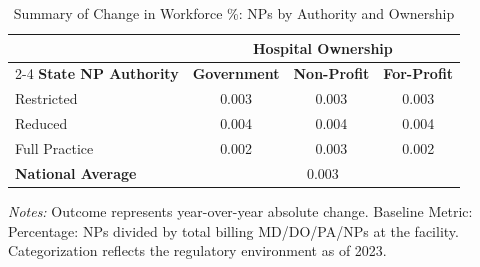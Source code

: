 \begin{table}[htbp]
    \centering
    \caption{Summary of Change in Workforce \%: NPs by Authority and Ownership}
    \label{tab:d_pct_np_own}
    \vspace{0.2cm}
    \begin{tabular}{lccc}
        \toprule
        & \multicolumn{3}{c}{\textbf{Hospital Ownership}} \\
        \cmidrule(lr){2-4}
        \textbf{State NP Authority} & \textbf{Government} & \textbf{Non-Profit} & \textbf{For-Profit} \\
        \midrule
        Restricted & 0.003 & 0.003 & 0.003 \\
        Reduced & 0.004 & 0.004 & 0.004 \\
        Full Practice & 0.002 & 0.003 & 0.002 \\
        \midrule
        \textbf{National Average} & \multicolumn{3}{c}{0.003} \\
        \bottomrule
    \end{tabular}
    \vspace{0.1cm}
    \begin{minipage}{0.85\textwidth}
        \footnotesize \textit{Notes:} Outcome represents year-over-year absolute change. Baseline Metric: Percentage: NPs divided by total billing MD/DO/PA/NPs at the facility. Categorization reflects the regulatory environment as of 2023.
    \end{minipage}
\end{table}